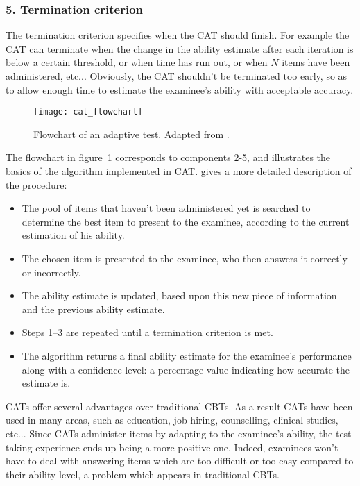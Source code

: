 \subsubsection{5. Termination criterion}
The termination criterion specifies when the CAT should finish. For example the CAT can terminate when the change in the ability estimate after each iteration is below a certain threshold, or when time has run out, or when $N$ items have been administered, etc... Obviously, the CAT shouldn't be terminated too early, so as to allow enough time to estimate the examinee's ability with acceptable accuracy.

\begin{figure}[H]
\centering
\texttt{[image: cat\_flowchart]}
\caption{Flowchart of an adaptive test. Adapted from \cite{SIETTE}.}
\label{fig:cat_flowchart}
\end{figure}

The flowchart in figure~\ref{fig:cat_flowchart} corresponds to components 2-5, and illustrates the basics of the algorithm implemented in CAT. \cite{CAT-Wiki} gives a more detailed description of the procedure:
\begin{itemize}
\item[1.] The pool of items that haven't been administered yet is searched to determine the best item to present to the examinee, according to the current estimation of his ability.
\item[2.] The chosen item is presented to the examinee, who then answers it correctly or incorrectly.
\item[3.] The ability estimate is updated, based upon this new piece of information and the previous ability estimate.
\item[4.] Steps 1–3 are repeated until a termination criterion is met.
\item[5.] The algorithm returns a final ability estimate for the examinee's performance along with a confidence level: a percentage value indicating how accurate the estimate is.
\end{itemize}

CATs offer several advantages over traditional CBTs. As a result CATs have been used in many areas\cite{CAT-Areas}, such as education, job hiring, counselling, clinical studies, etc... Since CATs administer items by adapting to the examinee's ability, the test-taking experience ends up being a more positive one. Indeed, examinees won't have to deal with answering items which are too difficult or too easy compared to their ability level, a problem which appears in traditional CBTs.\newline


